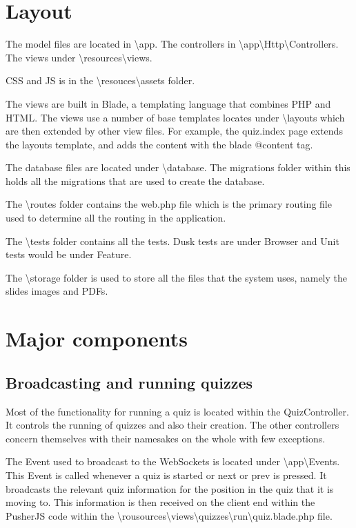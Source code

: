 \section{Layout}
The model files are located in \textbackslash app. The controllers in \textbackslash app\textbackslash Http\textbackslash Controllers. The views under \textbackslash resources\textbackslash views.

CSS  and JS is in the \textbackslash resouces\textbackslash assets folder.

The views are built in Blade, a templating language that combines PHP and HTML. The views use a number of base templates locates under \textbackslash layouts which are then extended by other view files. For example, the quiz.index page extends the layouts template, and adds the content with the blade @content tag.

The database files are located under \textbackslash database. The migrations folder within this holds all the migrations that are used to create the database.

The \textbackslash routes folder contains the web.php file which is the primary routing file used to determine all the routing in the application.

The \textbackslash tests folder contains all the tests. Dusk tests are under Browser and Unit tests would be under Feature.

The \textbackslash storage folder is used to store all the files that the system uses, namely the slides images and PDFs.

\section{Major components}
\subsection{Broadcasting and running quizzes}
Most of the functionality for running a quiz is located within the QuizController. It controls the running of quizzes and also their creation. The other controllers concern themselves with their namesakes on the whole with few exceptions.

The Event used to broadcast to the WebSockets is located under \textbackslash app\textbackslash Events. This Event is called whenever a quiz is started or next or prev is pressed. It broadcasts the relevant quiz information for the position in the quiz that it is moving to. This information is then received on the client end within the PusherJS code within the \textbackslash rousources\textbackslash views\textbackslash quizzes\textbackslash run\textbackslash quiz.blade.php file.


